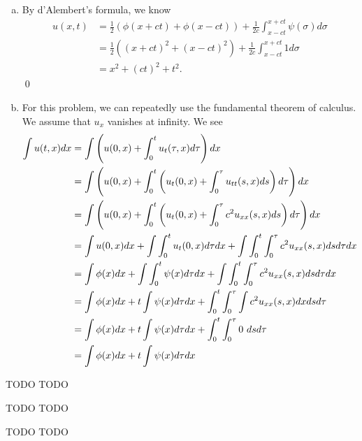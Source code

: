 \documentclass{article}
\begin{document}
\begin{enumerate}[(a)]
    \item By d'Alembert's formula, we know 
    \begin{align*}
        u(x,t) &= \frac{1}{2}(\phi(x+ct)+\phi(x-ct)) + \frac{1}{2c}\int_{x-ct}^{x+ct} \psi(\sigma) d \sigma\\
        &= \frac{1}{2}((x+ct)^2+(x-ct)^2) + \frac{1}{2c}\int_{x-ct}^{x+ct} 1 d \sigma\\
        &= x^2 + (ct)^2 + t^2.
    \end{align*}
    \qed
    \item For this problem, we can repeatedly use the fundamental theorem of calculus. We assume that $u_x$ vanishes at infinity. We see 
    \begin{align*}
        \int u(t,x) dx &= \int \del{u(0,x) + \int_0^t u_t(\tau, x)d\tau} dx \\
        &= \int \del{u(0,x) + \int_0^t \del{u_t(0, x) +\int_0^\tau u_{tt}(s,x)ds}d\tau} dx\\
        &= \int \del{u(0,x) + \int_0^t \del{u_t(0, x) +\int_0^\tau c^2u_{xx}(s,x)ds}d\tau} dx\\
        &= \int u(0,x) dx  +\int \int_0^t u_t(0, x) d\tau dx+\int \int_0^t \int_0^\tau c^2u_{xx}(s,x)dsd\tau dx\\
        &= \int \phi(x) dx  +\int \int_0^t \psi(x) d\tau dx+\int \int_0^t \int_0^\tau c^2u_{xx}(s,x)dsd\tau dx\\
        &= \int \phi(x) dx  +t\int \psi(x) d\tau dx+ \int_0^t \int_0^\tau \int c^2u_{xx}(s,x) dx dsd\tau \\
        &= \int \phi(x) dx  +t\int \psi(x) d\tau dx+ \int_0^t \int_0^\tau 0\  dsd\tau \\
        &= \int \phi(x) dx  +t\int \psi(x) d\tau dx 
    \end{align*}
\end{enumerate}


\newpage
{} TODO
 \tri
\hop 
\solution
TODO 


\newpage
{} TODO
 \tri
\hop 
\solution
TODO 


\newpage
{} TODO
 \tri
\hop 
\solution
TODO 
\end{document}
